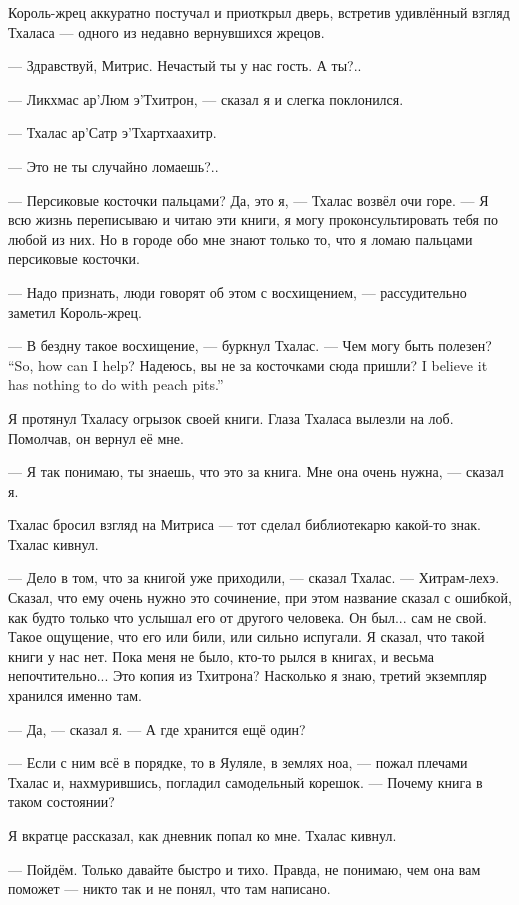 Король-жрец аккуратно постучал и приоткрыл дверь, встретив удивлённый взгляд Тхаласа --- одного из недавно вернувшихся жрецов.

--- Здравствуй, Митрис.
Нечастый ты у нас гость.
А ты?..

--- Ликхмас ар’Люм э’Тхитрон, --- сказал я и слегка поклонился.

--- Тхалас ар’Сатр э’Тхартхаахитр.

--- Это не ты случайно ломаешь?..

--- Персиковые косточки пальцами?
Да, это я, --- Тхалас возвёл очи горе.
--- Я всю жизнь переписываю и читаю эти книги, я могу проконсультировать тебя по любой из них.
Но в городе обо мне знают только то, что я ломаю пальцами персиковые косточки.

--- Надо признать, люди говорят об этом с восхищением, --- рассудительно заметил Король-жрец.

--- В бездну такое восхищение, --- буркнул Тхалас.
{--- Чем могу быть полезен?}
{``So, how can I help?}
{Надеюсь, вы не за косточками сюда пришли?}
{I believe it has nothing to do with peach pits.''}

Я протянул Тхаласу огрызок своей книги.
Глаза Тхаласа вылезли на лоб.
Помолчав, он вернул её мне.

--- Я так понимаю, ты знаешь, что это за книга.
Мне она очень нужна, --- сказал я.

Тхалас бросил взгляд на Митриса --- тот сделал библиотекарю какой-то знак.
Тхалас кивнул.

--- Дело в том, что за книгой уже приходили, --- сказал Тхалас.
--- Хитрам-лехэ.
Сказал, что ему очень нужно это сочинение, при этом название сказал с ошибкой, как будто только что услышал его от другого человека.
Он был... сам не свой.
Такое ощущение, что его или били, или сильно испугали.
Я сказал, что такой книги у нас нет.
Пока меня не было, кто-то рылся в книгах, и весьма непочтительно...
Это копия из Тхитрона?
Насколько я знаю, третий экземпляр хранился именно там.

--- Да, --- сказал я.
--- А где хранится ещё один?

--- Если с ним всё в порядке, то в Яуляле, в землях ноа, --- пожал плечами Тхалас и, нахмурившись, погладил самодельный корешок.
--- Почему книга в таком состоянии?

Я вкратце рассказал, как дневник попал ко мне.
Тхалас кивнул.

--- Пойдём.
Только давайте быстро и тихо.
Правда, не понимаю, чем она вам поможет --- никто так и не понял, что там написано.

